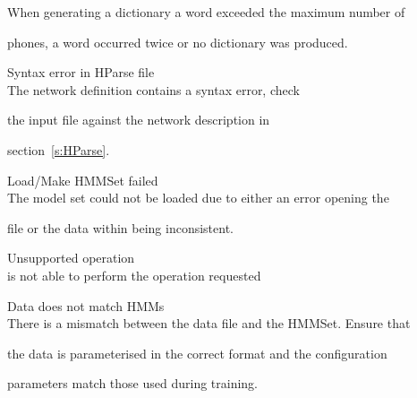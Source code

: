 \begin{itemize}
\begin{itemize}
        When generating a dictionary a word exceeded the maximum number of 


        phones, a word occurred twice or no dictionary was produced.





 Syntax error in HParse file\\


        The  network definition contains a syntax error, check 


        the input file against the network description in 


        section~\ref{s:HParse}.





\end{itemize}










\begin{itemize}





    Load/Make HMMSet failed\\


        The model set could not be loaded due to either an error opening the


        file or the data within being inconsistent.





 Unsupported operation\\


         is not able to perform the operation requested





 Data does not match HMMs\\


        There is a mismatch between the data file and the HMMSet.  Ensure that


        the data is parameterised in the correct format and the configuration


        parameters match those used during training.






\end{itemize}
\end{itemize}
